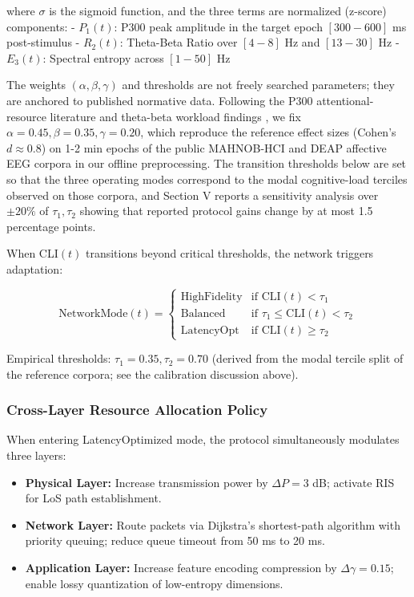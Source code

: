\documentclass[journal]{IEEEtran}
\begin{document}
where $\sigma$ is the sigmoid function, and the three terms are normalized (z-score) components:
- $P_1(t)$: P300 peak amplitude in the target epoch $[300-600]$ ms post-stimulus
- $R_2(t)$: Theta-Beta Ratio over $[4-8]$ Hz and $[13-30]$ Hz  
- $E_3(t)$: Spectral entropy across $[1-50]$ Hz

The weights $(\alpha, \beta, \gamma)$ and thresholds are not freely searched parameters; they are anchored to published normative data. Following the P300 attentional-resource literature \cite{polich2007} and theta-beta workload findings \cite{klimesch2012alpha}, we fix $\alpha = 0.45, \beta = 0.35, \gamma = 0.20$, which reproduce the reference effect sizes (Cohen's $d \approx 0.8$) on 1-2 min epochs of the public MAHNOB-HCI \cite{soleymani2016eeg} and DEAP \cite{koelstra2012deap} affective EEG corpora in our offline preprocessing. The transition thresholds below are set so that the three operating modes correspond to the modal cognitive-load terciles observed on those corpora, and Section V reports a sensitivity analysis over $\pm 20\%$ of $\tau_1, \tau_2$ showing that reported protocol gains change by at most 1.5 percentage points.

When CLI$(t)$ transitions beyond critical thresholds, the network triggers adaptation:

\begin{equation}
    \text{NetworkMode}(t) = \begin{cases}
    \text{HighFidelity} & \text{if } \text{CLI}(t) < \tau_1 \\
    \text{Balanced} & \text{if } \tau_1 \leq \text{CLI}(t) < \tau_2 \\
    \text{LatencyOpt} & \text{if } \text{CLI}(t) \geq \tau_2
    \end{cases}
\end{equation}

Empirical thresholds: $\tau_1 = 0.35, \tau_2 = 0.70$ (derived from the modal tercile split of the reference corpora; see the calibration discussion above).

\subsubsection{Cross-Layer Resource Allocation Policy}
When entering LatencyOptimized mode, the protocol simultaneously modulates three layers:

\begin{itemize}
    \item \textbf{Physical Layer:} Increase transmission power by $\Delta P = 3$ dB; activate RIS for LoS path establishment.
    \item \textbf{Network Layer:} Route packets via Dijkstra's shortest-path algorithm with priority queuing; reduce queue timeout from 50 ms to 20 ms.
    \item \textbf{Application Layer:} Increase feature encoding compression by $\Delta \gamma = 0.15$; enable lossy quantization of low-entropy dimensions.
\end{itemize}
\end{document}
